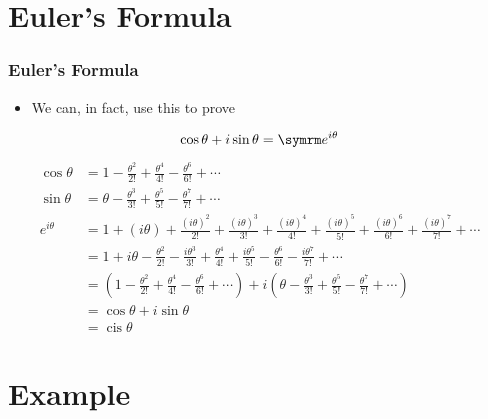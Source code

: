 \documentclass{beamer}
\DeclareMathOperator\cis{cis}
\begin{document}
\section{Euler's Formula}

\begin{frame}
  \frametitle{Euler's Formula}
  \begin{itemize}
    \item We can, in fact, use this to prove
  \end{itemize}
  \begin{equation*}
    \cos \theta + i\sin \theta = \e^{i\theta}
  \end{equation*}
  \begin{align*}
    \cos \theta & = 1 - \frac{\theta^2}{2!} + \frac{\theta^4}{4!} - \frac{\theta^6}{6!} + \cdots \\
    \sin \theta & = \theta - \frac{\theta^3}{3!} + \frac{\theta^5}{5!} - \frac{\theta^7}{7!} + \cdots \\
    e^{i\theta} & = 1 + (i\theta) + \frac{(i\theta)^2}{2!} + \frac{(i\theta)^3}{3!} + \frac{(i\theta)^4}{4!} + \frac{(i\theta)^5}{5!} + \frac{(i\theta)^6}{6!} + \frac{(i\theta)^7}{7!} + \cdots \\
    & = 1 + i\theta - \frac{\theta^2}{2!} - \frac{i\theta^3}{3!} + \frac{\theta^4}{4!} + \frac{i\theta^5}{5!} - \frac{\theta^6}{6!} - \frac{i\theta^7}{7!} + \cdots \\
    & = \left(1 - \frac{\theta^2}{2!} + \frac{\theta^4}{4!} - \frac{\theta^6}{6!} + \cdots\right) + i\left(\theta - \frac{\theta^3}{3!} + \frac{\theta^5}{5!} - \frac{\theta^7}{7!} + \cdots\right) \\
    & = \cos \theta + i\sin \theta \\
    & = \cis \theta
  \end{align*}
\end{frame}

\section{Example}
\end{document}

